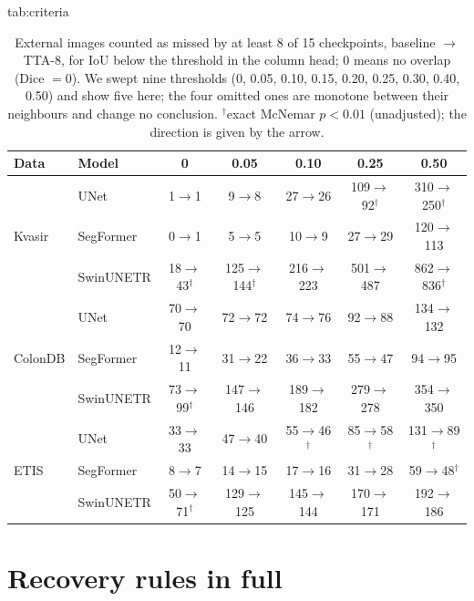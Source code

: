 \begin{table}[htbp]
\floatconts
  {tab:criteria}%
  {\caption{External images counted as missed by at least 8 of 15 checkpoints, baseline $\rightarrow$ TTA-8, for IoU below the threshold in the column head; 0 means no overlap (Dice $=0$). We swept nine thresholds (0, 0.05, 0.10, 0.15, 0.20, 0.25, 0.30, 0.40, 0.50) and show five here; the four omitted ones are monotone between their neighbours and change no conclusion. $^{\dagger}$exact McNemar $p<0.01$ (unadjusted); the direction is given by the arrow.}}%
  {
  \begin{tabular}{@{}llccccc@{}}
  \toprule
  Data & Model & 0 & 0.05 & 0.10 & 0.25 & 0.50 \\
  \midrule
  \multirow{3}{*}{Kvasir} & UNet & 1$\rightarrow$1 & 9$\rightarrow$8 & 27$\rightarrow$26 & 109$\rightarrow$92$^{\dagger}$ & 310$\rightarrow$250$^{\dagger}$ \\
   & SegFormer & 0$\rightarrow$1 & 5$\rightarrow$5 & 10$\rightarrow$9 & 27$\rightarrow$29 & 120$\rightarrow$113 \\
   & SwinUNETR & 18$\rightarrow$43$^{\dagger}$ & 125$\rightarrow$144$^{\dagger}$ & 216$\rightarrow$223 & 501$\rightarrow$487 & 862$\rightarrow$836$^{\dagger}$ \\
  \midrule
  \multirow{3}{*}{ColonDB} & UNet & 70$\rightarrow$70 & 72$\rightarrow$72 & 74$\rightarrow$76 & 92$\rightarrow$88 & 134$\rightarrow$132 \\
   & SegFormer & 12$\rightarrow$11 & 31$\rightarrow$22 & 36$\rightarrow$33 & 55$\rightarrow$47 & 94$\rightarrow$95 \\
   & SwinUNETR & 73$\rightarrow$99$^{\dagger}$ & 147$\rightarrow$146 & 189$\rightarrow$182 & 279$\rightarrow$278 & 354$\rightarrow$350 \\
  \midrule
  \multirow{3}{*}{ETIS} & UNet & 33$\rightarrow$33 & 47$\rightarrow$40 & 55$\rightarrow$46$^{\dagger}$ & 85$\rightarrow$58$^{\dagger}$ & 131$\rightarrow$89$^{\dagger}$ \\
   & SegFormer & 8$\rightarrow$7 & 14$\rightarrow$15 & 17$\rightarrow$16 & 31$\rightarrow$28 & 59$\rightarrow$48$^{\dagger}$ \\
   & SwinUNETR & 50$\rightarrow$71$^{\dagger}$ & 129$\rightarrow$125 & 145$\rightarrow$144 & 170$\rightarrow$171 & 192$\rightarrow$186 \\
  \bottomrule
  \end{tabular}}
\end{table}


\section{Recovery rules in full}
\label{app:rules}

